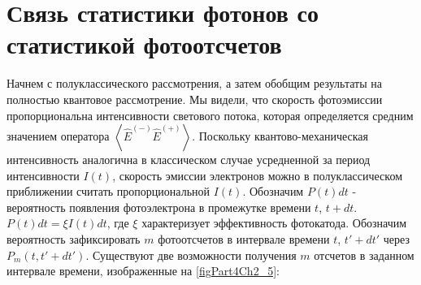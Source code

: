 \section{Связь статистики фотонов со статистикой фотоотсчетов}
Начнем с полуклассического рассмотрения, а затем обобщим результаты на
полностью квантовое рассмотрение. Мы видели, что скорость фотоэмиссии
пропорциональна интенсивности светового потока, которая определяется
средним значением оператора $\left<\hat{E}^{(-)}\hat{E}^{(+)}\right>$. 
Поскольку квантово-механическая
интенсивность аналогична в классическом случае усредненной за период 
интенсивности $I\left(t\right)$,  скорость эмиссии электронов можно в
полуклассическом приближении считать пропорциональной
$I\left(t\right)$. Обозначим $P\left(t\right)dt$ - вероятность
появления фотоэлектрона в промежутке времени $t$, $t + dt$.  
$P\left(t\right)dt = \xi I\left(t\right)dt$,  где $\xi$ характеризует
эффективность фотокатода. Обозначим вероятность зафиксировать $m$
фотоотсчетов в интервале времени $t$, $t' + dt'$  через $P_m\left(t,
t' + dt'\right)$. Существуют две возможности получения $m$ отсчетов в
заданном интервале времени, изображенные на \autoref{figPart4Ch2_5}: 



